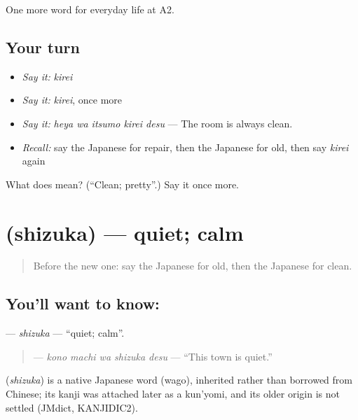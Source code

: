\begin{grammarlens}[title={What you've built}]
One more word for everyday life at A2.
\end{grammarlens}

\subsection*{Your turn}
\begin{itemize}
\raggedright
  \item \emph{Say it:} \emph{kirei}
  \item \emph{Say it:} \emph{kirei}, once more
  \item \emph{Say it:} \emph{heya wa itsumo kirei desu} — The room is always clean.
  \item \emph{Recall:} say the Japanese for repair, then the Japanese for old, then say \emph{kirei} again
\end{itemize}

\begin{tcolorbox}[breakable,colback=teal!4,colframe=teal!35!black,title={Before you move on}]
What does  mean? (\textquotedblleft{}Clean; pretty\textquotedblright{}.) Say it once more.
\end{tcolorbox}
\section[\texorpdfstring{\ja{しずか} (shizuka)}{しずか (shizuka)}]{ (shizuka) — quiet; calm}

\label{lesson:JA-C163-shizuka}



\begin{quote}
Before the new one: say the Japanese for old, then the Japanese for clean.
\end{quote}

\subsection*{You'll want to know: }
\textbf{} — \emph{shizuka} — \textquotedblleft{}quiet; calm\textquotedblright{}.

\begin{quote}
\textbf{  } — \emph{kono machi wa shizuka desu} — \textquotedblleft{}This town is quiet.\textquotedblright{}
\end{quote}

\begin{cousinweb}
\textbf{} (\emph{shizuka}) is a native Japanese word (wago), inherited rather than borrowed from Chinese; its kanji was attached later as a kun'yomi, and its older origin is not settled (JMdict, KANJIDIC2).
\end{cousinweb}

